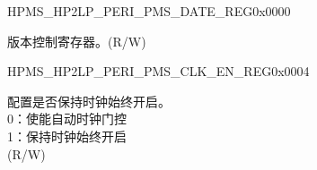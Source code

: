 \begin{register}{H}{PMS\_HP2LP\_PERI\_PMS\_DATE\_REG}{0x0000}\label{regdesc:PMSHP2LPPERIPMSDATEREG}
%
\regnewline%
\begin{regdesc}\begin{reglist}
\label{fielddesc:PMSHP2LPPERIPMSDATE}\item [PMS\_HP2LP\_PERI\_PMS\_DATE] 版本控制寄存器。(R/W)
\end{reglist}\end{regdesc}
\end{register}


\begin{register}{H}{PMS\_HP2LP\_PERI\_PMS\_CLK\_EN\_REG}{0x0004}\label{regdesc:PMSHP2LPPERIPMSCLKENREG}
%
%
\regnewline%
\begin{regdesc}\begin{reglist}
\label{fielddesc:PMSHP2LPPERIPMSCLKEN}\item [PMS\_HP2LP\_PERI\_PMS\_CLK\_EN] 配置是否保持时钟始终开启。\\
0：使能自动时钟门控 \\
1：保持时钟始终开启 \\(R/W)
\end{reglist}\end{regdesc}
\end{register}


